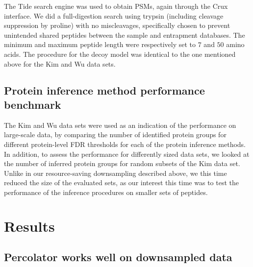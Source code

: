 \documentclass{article}
\begin{document}

The Tide search engine was used to obtain PSMs, again through the Crux 
interface. We did a full-digestion search using trypsin (including 
cleavage suppression by proline) with no miscleavages, specifically 
chosen to prevent unintended shared peptides between the sample and 
entrapment databases. The minimum and maximum peptide length were 
respectively set to $7$ and $50$ amino acids. The procedure for the 
decoy model was identical to the one mentioned above for the Kim and 
Wu data sets.

\subsection*{Protein inference method performance benchmark}

The Kim and Wu data sets were used as an indication of the performance 
on large-scale data, by comparing the number of identified protein 
groups for different protein-level FDR thresholds for each of the 
protein inference methods. In addition, to assess the performance for 
differently sized data sets, we looked at the number of inferred 
protein groups for random subsets of the Kim data set. Unlike in our 
resource-saving downsampling described above, we this time reduced the 
size of the evaluated sets, as our interest this time was to test the 
performance of the inference procedures on smaller sets of peptides.

\section*{Results}

\subsection*{Percolator works well on downsampled data}
\end{document}
